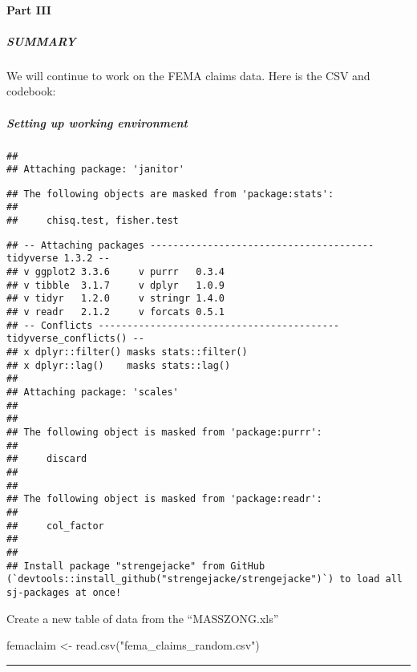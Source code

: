 \documentclass[
]{article}
\newenvironment{Shaded}{\begin{snugshade}}{\end{snugshade}}
\newcommand{\FunctionTok}[1]{\textcolor[rgb]{0.00,0.00,0.00}{#1}}
\newcommand{\NormalTok}[1]{#1}
\newcommand{\OtherTok}[1]{\textcolor[rgb]{0.56,0.35,0.01}{#1}}
\newcommand{\StringTok}[1]{\textcolor[rgb]{0.31,0.60,0.02}{#1}}
\begin{document}
\hypertarget{part-iii}{%
\paragraph{Part III}\label{part-iii}}

\hypertarget{summary}{%
\subparagraph{SUMMARY}\label{summary}}

We will continue to work on the FEMA claims data. Here is the CSV and
codebook:

\hypertarget{setting-up-working-environment}{%
\subparagraph{Setting up working
environment}\label{setting-up-working-environment}}

\begin{verbatim}
## 
## Attaching package: 'janitor'
\end{verbatim}

\begin{verbatim}
## The following objects are masked from 'package:stats':
## 
##     chisq.test, fisher.test
\end{verbatim}

\begin{verbatim}
## -- Attaching packages --------------------------------------- tidyverse 1.3.2 --
## v ggplot2 3.3.6     v purrr   0.3.4
## v tibble  3.1.7     v dplyr   1.0.9
## v tidyr   1.2.0     v stringr 1.4.0
## v readr   2.1.2     v forcats 0.5.1
## -- Conflicts ------------------------------------------ tidyverse_conflicts() --
## x dplyr::filter() masks stats::filter()
## x dplyr::lag()    masks stats::lag()
## 
## Attaching package: 'scales'
## 
## 
## The following object is masked from 'package:purrr':
## 
##     discard
## 
## 
## The following object is masked from 'package:readr':
## 
##     col_factor
## 
## 
## Install package "strengejacke" from GitHub (`devtools::install_github("strengejacke/strengejacke")`) to load all sj-packages at once!
\end{verbatim}

Create a new table of data from the ``MASSZONG.xls''

\begin{Shaded}
\begin{Highlighting}[]
\NormalTok{femaclaim }\OtherTok{\textless{}{-}} \FunctionTok{read.csv}\NormalTok{(}\StringTok{"fema\_claims\_random.csv"}\NormalTok{)}
\end{Highlighting}
\end{Shaded}

\begin{center}\rule{0.5\linewidth}{0.5pt}\end{center}
\end{document}
